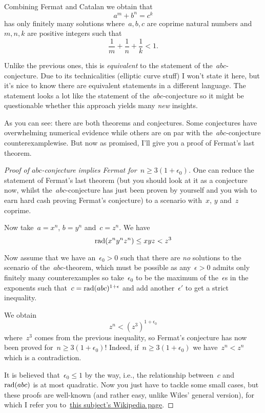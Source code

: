 \begin{description}
    Combining Fermat and Catalan we obtain that
    \begin{equation}
      a^m+b^n=c^k
    \end{equation}
    has only finitely many solutions where~$a,b,c$ are coprime natural numbers and~$m,n,k$ are positive integers such that
    \begin{equation}
      \frac{1}{m}+\frac{1}{n}+\frac{1}{k}<1.
    \end{equation}

  \item[\textbf{Szpiro's conjecture}] Unlike the previous ones, this is \emph{equivalent} to the statement of the~$abc$-conjecture. Due to its technicalities (elliptic curve stuff) I won't state it here, but it's nice to know there are equivalent statements in a different language. The statement looks a lot like the statement of the~$abc$\nobreakdash-conjecture so it might be questionable whether this approach yields many \emph{new} insights.
\end{description}

As you can see: there are both theorems and conjectures. Some conjectures have overwhelming numerical evidence while others are on par with the~$abc$-conjecture counterexamplewise. But now as promised, I'll give you a proof of Fermat's last theorem.


\begin{proof}[Proof of $abc$-conjecture implies Fermat for~$n\geq3(1+\epsilon_0)$]
  One can reduce the statement of Fermat's last theorem (but you should look at it as a conjecture now, whilst the~$abc$\nobreakdash-conjecture has just been proven by yourself and you wish to earn hard cash proving Fermat's conjecture) to a scenario with~$x$, $y$ and~$z$ coprime.
  
  Now take~$a=x^n$, $b=y^n$ and~$c=z^n$. We have
  \begin{equation}
    \operatorname{rad}(x^ny^nz^n)\leq xyz<z^3
  \end{equation}

  Now assume that we have an~$\epsilon_0>0$ such that there are \emph{no} solutions to the scenario of the~$abc$\nobreakdash-theorem, which must be possible as any~$\epsilon>0$ admits only finitely many counterexamples so take~$\epsilon_0$ to be the maximum of the~$\epsilon$s in the exponents such that~$c=\operatorname{rad}(abc)^{1+\epsilon}$ and add another~$\epsilon'$ to get a strict inequality.
  
  We obtain
  \begin{equation}
    z^n<(z^3)^{1+\epsilon_0}
  \end{equation}
  where~$z^3$ comes from the previous inequality, so Fermat's conjecture has now been proved for~$n\geq 3(1+\epsilon_0)$! Indeed, if~$n\geq 3(1+\epsilon_0)$ we have~$z^n<z^n$ which is a contradiction.

  It is believed that~$\epsilon_0\leq 1$ by the way, i.e., the relationship between~$c$ and~$\operatorname{rad}(abc)$ is at most quadratic. Now you just have to tackle some small cases, but these proofs are well-known (and rather easy, unlike Wiles' general version), for which I refer you to~\href{http://en.wikipedia.org/wiki/Fermat's_Last_Theorem#Proofs_for_specific_exponents}{this subject's Wikipedia page}.
\end{proof}
